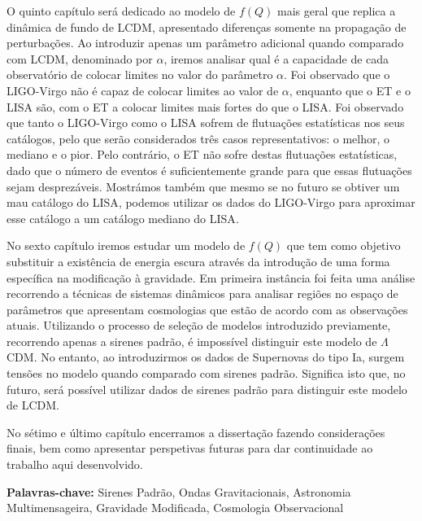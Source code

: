 O quinto capítulo será dedicado ao modelo de $f(Q)$ mais geral que replica a dinâmica de fundo de \gls{LCDM}, apresentado diferenças somente na propagação de perturbações. Ao introduzir apenas um parâmetro adicional quando comparado com \gls{LCDM}, denominado por $\alpha$, iremos analisar qual é a capacidade de cada observatório de colocar limites no valor do parâmetro $\alpha$. Foi observado que o \gls{LIGO}-Virgo não é capaz de colocar limites ao valor de $\alpha$, enquanto que o \gls{ET} e o \gls{LISA} são, com o \gls{ET} a colocar limites mais fortes do que o \gls{LISA}. Foi observado que tanto o \gls{LIGO}-Virgo como o \gls{LISA} sofrem de flutuações estatísticas nos seus catálogos, pelo que serão considerados três casos representativos: o melhor, o mediano e o pior. Pelo contrário, o \gls{ET} não sofre destas flutuações estatísticas, dado que o número de eventos é suficientemente grande para que essas flutuações sejam desprezáveis. Mostrámos também que mesmo se no futuro se obtiver um mau catálogo do \gls{LISA}, podemos utilizar os dados do \gls{LIGO}-Virgo para aproximar esse catálogo a um catálogo mediano do \gls{LISA}.

No sexto capítulo iremos estudar um modelo de $f(Q)$ que tem como objetivo substituir a existência de energia escura através da introdução de uma forma específica na modificação à gravidade. Em primeira instância foi feita uma análise recorrendo a técnicas de sistemas dinâmicos para analisar regiões no espaço de parâmetros que apresentam cosmologias que estão de acordo com as observações atuais. Utilizando o processo de seleção de modelos introduzido previamente, recorrendo apenas a sirenes padrão, é impossível distinguir este modelo de $\Lambda$CDM. No entanto, ao introduzirmos os dados de Supernovas do tipo Ia, surgem tensões no modelo quando comparado com sirenes padrão. Significa isto que, no futuro, será possível utilizar dados de sirenes padrão para distinguir este modelo de \gls{LCDM}.

No sétimo e último capítulo encerramos a dissertação fazendo considerações finais, bem como apresentar perspetivas futuras para dar continuidade ao trabalho aqui desenvolvido.

\vfill
\begin{flushleft}
    \textbf{Palavras-chave:}
    Sirenes Padrão, Ondas Gravitacionais, Astronomia Multimensageira, Gravidade Modificada, Cosmologia Observacional
\end{flushleft}

